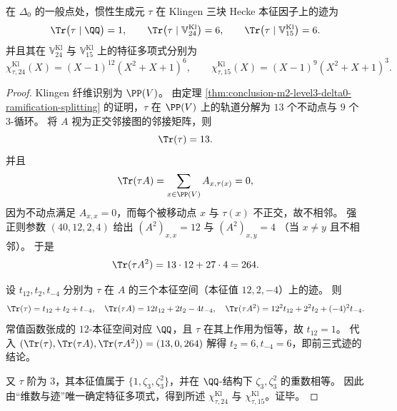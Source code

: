 \begin{theorem}\label{thm:conclusion-m2-level3-delta0-inertia-klingen-charpoly}
在 \(\Delta_0\) 的一般点处，惯性生成元 \(\tau\) 在 Klingen 三块 Hecke 本征因子上的迹为
\[
\Tr\bigl(\tau\mid \QQ\bigr)=1,\qquad
\Tr\bigl(\tau\mid \mathbb V_{24}^{\mathrm{Kl}}\bigr)=6,\qquad
\Tr\bigl(\tau\mid \mathbb V_{15}^{\mathrm{Kl}}\bigr)=6.
\]
并且其在 \(\mathbb V_{24}^{\mathrm{Kl}}\) 与 \(\mathbb V_{15}^{\mathrm{Kl}}\) 上的特征多项式分别为
\[
\chi_{\tau,24}^{\mathrm{Kl}}(X)=(X-1)^{12}(X^2+X+1)^6,\qquad
\chi_{\tau,15}^{\mathrm{Kl}}(X)=(X-1)^{9}(X^2+X+1)^3.
\]
\end{theorem}
\begin{proof}
Klingen 纤维识别为 \(\PP(V)\)。
由定理 \ref{thm:conclusion-m2-level3-delta0-ramification-splitting} 的证明，\(\tau\) 在 \(\PP(V)\) 上的轨道分解为 \(13\) 个不动点与 \(9\) 个 \(3\)-循环。
将 \(A\) 视为正交邻接图的邻接矩阵，则
\[
\Tr(\tau)=13.
\]
并且
\[
\Tr(\tau A)=\sum_{x\in \PP(V)}A_{x,\tau(x)}=0,
\]
因为不动点满足 \(A_{x,x}=0\)，而每个被移动点 \(x\) 与 \(\tau(x)\) 不正交，故不相邻。
强正则参数 \((40,12,2,4)\) 给出
\(
(A^2)_{x,x}=12
\)
与
\(
(A^2)_{x,y}=4
\)
（当 \(x\neq y\) 且不相邻）。
于是
\[
\Tr(\tau A^2)=13\cdot 12 + 27\cdot 4=264.
\]
\par
设
\(
t_{12},t_{2},t_{-4}
\)
分别为 \(\tau\) 在 \(A\) 的三个本征空间（本征值 \(12,2,-4\)）上的迹。
则
\[
\Tr(\tau)=t_{12}+t_{2}+t_{-4},\quad
\Tr(\tau A)=12t_{12}+2t_{2}-4t_{-4},\quad
\Tr(\tau A^2)=12^2t_{12}+2^2t_{2}+(-4)^2t_{-4}.
\]
常值函数张成的 \(12\)-本征空间对应 \(\QQ\)，且 \(\tau\) 在其上作用为恒等，故 \(t_{12}=1\)。
代入 \((\Tr(\tau),\Tr(\tau A),\Tr(\tau A^2))=(13,0,264)\) 解得 \(t_{2}=6,t_{-4}=6\)，即前三式迹的结论。
\par
又 \(\tau\) 阶为 \(3\)，其本征值属于 \(\{1,\zeta_3,\zeta_3^2\}\)，并在 \(\QQ\)-结构下 \(\zeta_3,\zeta_3^2\) 的重数相等。
因此由“维数与迹”唯一确定特征多项式，得到所述 \(\chi_{\tau,24}^{\mathrm{Kl}}\) 与 \(\chi_{\tau,15}^{\mathrm{Kl}}\)。证毕。
\end{proof}

